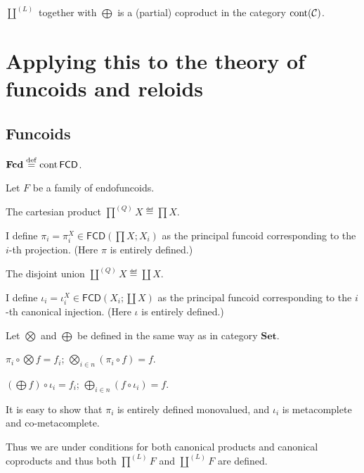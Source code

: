 \begin{thm}
  $\coprod^{(L)}$ together with $\bigoplus$ is a (partial) coproduct in the
  category $\operatorname{cont} (\mathcal{C})$.
\end{thm}

\section{Applying this to the theory of funcoids and reloids}

\subsection{Funcoids}

\begin{defn}
  $\mathbf{Fcd} \overset{\mathrm{def}}{=} \operatorname{cont} \mathsf{FCD}$.
\end{defn}

Let $F$ be a family of endofuncoids.

The cartesian product $\prod^{(Q)} X \eqdef \prod X$.

I define $\pi_i = \pi^X_i \in \mathsf{FCD} \left( \prod X ; X_i
\right)$ as the principal funcoid corresponding to the $i$-th projection.
(Here $\pi$ is entirely defined.)

The disjoint union $\coprod^{(Q)} X \eqdef \coprod X$.

I define $\iota_i = \iota^X_i \in \mathsf{FCD} \left( X_i ; \coprod X
\right)$ as the principal funcoid corresponding to the $i$-th canonical
injection. (Here $\iota$ is entirely defined.)

Let $\bigotimes$ and $\bigoplus$ be defined in the same way as in category
$\mathbf{Set}$.

\begin{obvious}
$\pi_i \circ \bigotimes f = f_i$; $\bigotimes_{i \in n} (\pi_i \circ f) =
f$.
\end{obvious}

\begin{obvious}
$\left( \bigoplus f \right) \circ \iota_i = f_i$; $\bigoplus_{i \in n} (f
\circ \iota_i) = f$.{\hspace*{\fill}}{\medskip}
\end{obvious}

It is easy to show that $\pi_i$ is entirely defined monovalued, and $\iota_i$
is metacomplete and co-metacomplete.

Thus we are under conditions for both canonical products and canonical
coproducts and thus both $\prod^{(L)} F$ and $\coprod^{(L)} F$ are defined.

